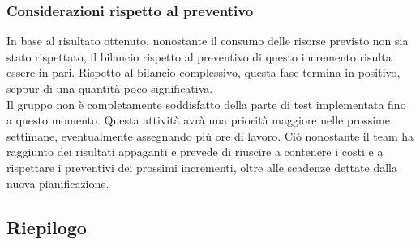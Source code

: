 \subsubsection{Considerazioni rispetto al preventivo}

In base al risultato ottenuto, nonostante il consumo delle risorse previsto non sia stato rispettato, il bilancio rispetto al preventivo di questo incremento risulta essere in pari. Rispetto al bilancio complessivo, questa fase termina in positivo, seppur di una quantità poco significativa. \\
Il gruppo non è completamente soddisfatto della parte di test implementata fino a questo momento. Questa attività avrà una priorità maggiore nelle prossime settimane, eventualmente assegnando più ore di lavoro. Ciò nonostante il team ha raggiunto dei risultati appaganti e prevede di riuscire a contenere i costi e a rispettare i preventivi dei prossimi incrementi, oltre alle scadenze dettate dalla nuova pianificazione.

\newpage

\subsection{Riepilogo}

